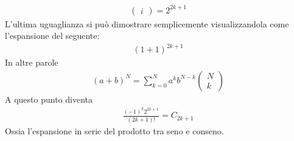 \documentclass[a4paper, oneside]{article}
\begin{document}
\begin{example} 
\begin{gather*}
\begin{pmatrix}
        i \end{pmatrix}  = 2^{2k + 1}
    \end{gather*}
    L'ultima uguaglianza si può dimostrare semplicemente visualizzandola come l'espansione del seguente:
    \begin{gather*}
        (1 + 1)^{2k + 1}
    \end{gather*}
    In altre parole 
    \begin{gather*}
        (a + b)^{N} = \sum_{k = 0}^{N} a^{k}b^{N - k} \begin{pmatrix} N \\
        k \end{pmatrix} 
    \end{gather*}
    A questo punto diventa
    \begin{gather*}
        \frac{(-1)^{k} 2^{2k + 1}}{(2k + 1)!} = C_{2k + 1}
    \end{gather*}
    Ossia l'espansione in serie del prodotto tra seno e conseno.
\end{example}
\end{document}
